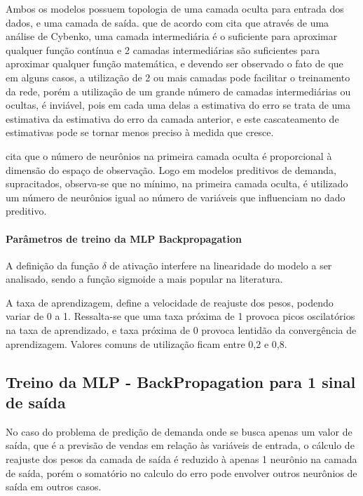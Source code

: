 \documentclass[	12pt, Times, openright, twoside, a4paper, english, brazil]{abntex2}
\begin{document}
            Ambos os modelos possuem topologia de uma camada oculta para entrada dos dados, e uma camada de saída. que de acordo com \cite{Braga2000} cita que através de uma análise de Cybenko, uma camada intermediária é o suficiente para aproximar qualquer função contínua e 2 camadas intermediárias são suficientes para aproximar qualquer função matemática, e devendo ser observado o fato de que em alguns casos, a utilização de 2 ou mais camadas pode facilitar o treinamento da rede, porém a utilização de um grande número de camadas intermediárias ou ocultas, é inviável, pois em cada uma delas a estimativa do erro se trata de uma estimativa da estimativa do erro da camada anterior, e este cascateamento de estimativas pode se tornar menos preciso à medida que cresce.
            
            \cite{Flavia2014} cita que o número de neurônios na primeira camada oculta é proporcional à dimensão do espaço de observação. Logo em modelos preditivos de demanda, supracitados, observa-se que no mínimo, na primeira camada oculta, é utilizado um número de neurônios igual ao número de variáveis que influenciam no dado preditivo.
            
            \paragraph*{Parâmetros de treino da MLP Backpropagation}
            A definição da função $\delta$ de ativação interfere na linearidade  do modelo a ser analisado, sendo a função sigmoide a mais popular na literatura. 
            
            A taxa de aprendizagem, define a velocidade de reajuste dos pesos, podendo variar de 0 a 1. Ressalta-se que uma taxa próxima de 1 provoca picos oscilatórios na taxa de aprendizado, e taxa próxima de 0 provoca lentidão da convergência de aprendizagem. Valores comuns de utilização ficam entre 0,2 e 0,8.
        
        \subsection{Treino da MLP - BackPropagation para 1 sinal de saída}
            No caso do problema de predição de demanda onde se busca apenas um valor de saída, que é a previsão de vendas em relação às variáveis de entrada, o cálculo de reajuste dos pesos da camada de saída é reduzido à apenas 1 neurônio na camada de saída, porém o somatório no calculo do erro pode envolver outros neurônios de saída em outros casos.
            
\end{document}
